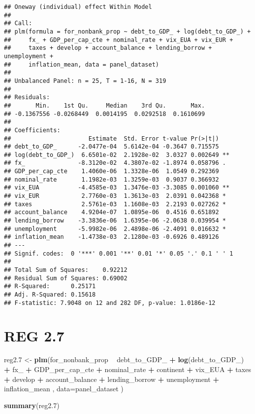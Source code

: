 \documentclass[]{article}
\newenvironment{Shaded}{\begin{snugshade}}{\end{snugshade}}
\newcommand{\KeywordTok}[1]{\textcolor[rgb]{0.13,0.29,0.53}{\textbf{#1}}}
\newcommand{\DataTypeTok}[1]{\textcolor[rgb]{0.13,0.29,0.53}{#1}}
\newcommand{\DecValTok}[1]{\textcolor[rgb]{0.00,0.00,0.81}{#1}}
\newcommand{\StringTok}[1]{\textcolor[rgb]{0.31,0.60,0.02}{#1}}
\newcommand{\OperatorTok}[1]{\textcolor[rgb]{0.81,0.36,0.00}{\textbf{#1}}}
\newcommand{\NormalTok}[1]{#1}
\begin{document}
\begin{verbatim}
## Oneway (individual) effect Within Model
## 
## Call:
## plm(formula = for_nonbank_prop ~ debt_to_GDP_ + log(debt_to_GDP_) + 
##     fx_ + GDP_per_cap_cte + nominal_rate + vix_EUA + vix_EUR + 
##     taxes + develop + account_balance + lending_borrow + unemployment + 
##     inflation_mean, data = panel_dataset)
## 
## Unbalanced Panel: n = 25, T = 1-16, N = 319
## 
## Residuals:
##       Min.    1st Qu.     Median    3rd Qu.       Max. 
## -0.1367556 -0.0268449  0.0014195  0.0292518  0.1610699 
## 
## Coefficients:
##                      Estimate  Std. Error t-value Pr(>|t|)   
## debt_to_GDP_      -2.0477e-04  5.6142e-04 -0.3647 0.715575   
## log(debt_to_GDP_)  6.6501e-02  2.1928e-02  3.0327 0.002649 **
## fx_               -8.3120e-02  4.3807e-02 -1.8974 0.058796 . 
## GDP_per_cap_cte    1.4060e-06  1.3328e-06  1.0549 0.292369   
## nominal_rate       1.1982e-03  1.3259e-03  0.9037 0.366932   
## vix_EUA           -4.4585e-03  1.3476e-03 -3.3085 0.001060 **
## vix_EUR            2.7760e-03  1.3613e-03  2.0391 0.042368 * 
## taxes              2.5761e-03  1.1608e-03  2.2193 0.027262 * 
## account_balance    4.9204e-07  1.0895e-06  0.4516 0.651892   
## lending_borrow    -3.3836e-06  1.6395e-06 -2.0638 0.039954 * 
## unemployment      -5.9982e-06  2.4898e-06 -2.4091 0.016632 * 
## inflation_mean    -1.4738e-03  2.1280e-03 -0.6926 0.489126   
## ---
## Signif. codes:  0 '***' 0.001 '**' 0.01 '*' 0.05 '.' 0.1 ' ' 1
## 
## Total Sum of Squares:    0.92212
## Residual Sum of Squares: 0.69002
## R-Squared:      0.25171
## Adj. R-Squared: 0.15618
## F-statistic: 7.9048 on 12 and 282 DF, p-value: 1.0186e-12
\end{verbatim}

\section{REG 2.7}\label{reg-2.7}

\begin{Shaded}
\begin{Highlighting}[]
\NormalTok{reg2.}\DecValTok{7}\NormalTok{ <-}\StringTok{ }\KeywordTok{plm}\NormalTok{(for_nonbank_prop }\OperatorTok{~}\StringTok{  }\NormalTok{debt_to_GDP_ }\OperatorTok{+}\StringTok{ }\KeywordTok{log}\NormalTok{(debt_to_GDP_) }\OperatorTok{+}\StringTok{ }\NormalTok{fx_ }\OperatorTok{+}\StringTok{ }\NormalTok{GDP_per_cap_cte }\OperatorTok{+}\StringTok{  }\NormalTok{nominal_rate }\OperatorTok{+}\StringTok{ }\NormalTok{continent }\OperatorTok{+}\StringTok{ }\NormalTok{vix_EUA  }\OperatorTok{+}\StringTok{ }\NormalTok{taxes }\OperatorTok{+}\StringTok{ }\NormalTok{develop }\OperatorTok{+}\StringTok{ }\NormalTok{account_balance }\OperatorTok{+}\StringTok{ }\NormalTok{lending_borrow }\OperatorTok{+}\StringTok{ }\NormalTok{unemployment }\OperatorTok{+}\StringTok{ }\NormalTok{inflation_mean , }\DataTypeTok{data=}\NormalTok{panel_dataset  )}

\KeywordTok{summary}\NormalTok{(reg2.}\DecValTok{7}\NormalTok{)}
\end{Highlighting}
\end{Shaded}
\end{document}
